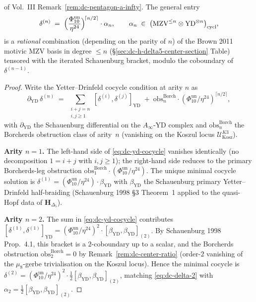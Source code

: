 \begin{proposition}
of Vol.~III
Remark~\ref{rem:dc-pentagon-a-infty}. The general entry
\begin{equation}
\label{eq:dc-delta-n-ansatz}
 \delta^{(n)} \;=\;
 \Bigl(\frac{\Phi_{10}^{\mathrm{un}}}{\eta^{24}}\Bigr)^{\!\lceil n/2\rceil}
 \cdot\alpha_n,
 \qquad
 \alpha_n \;\in\;
 \bigl(\mathrm{MZV}^{\leq n}\otimes\mathrm{YD}^{\otimes n}\bigr)_{\mathrm{cycl}},
\end{equation}
is a \emph{rational} combination (depending on the parity of $n$)
of the Brown 2011 motivic MZV basis in degree $\leq n$
(\S\ref{sec:dc-h-delta5-center-section} Table) tensored with the iterated
Schauenburg bracket, modulo the coboundary of
$\delta^{(n-1)}$.
\end{proposition}

\begin{proof}
Write the Yetter--Drinfeld cocycle condition at arity $n$ as
\begin{equation}
\label{eq:dc-yd-cocycle}
 \partial_{\mathrm{YD}}\,\delta^{(n)}
 \;=\;
 \sum_{\substack{i+j=n\\ i,j\geq 1}} [\delta^{(i)}, \delta^{(j)}]_{\mathrm{YD}}
 \;+\;
 \mathrm{obs}^{\mathrm{Borch}}_n\cdot (\Phi_{10}^{\mathrm{un}}/\eta^{24})^{\lceil n/2\rceil},
\end{equation}
with $\partial_{\mathrm{YD}}$ the Schauenburg differential on the
$A_\infty$-YD complex and
$\mathrm{obs}^{\mathrm{Borch}}_n$ the Borcherds obstruction class
of arity~$n$ (vanishing on the Koszul locus
$\mathcal{U}_{\mathrm{Kosz}}^{K3}$).

\textbf{Arity $n = 1$.} The left-hand side of \eqref{eq:dc-yd-cocycle}
vanishes identically (no decomposition $1 = i + j$ with $i,j\geq 1$);
the right-hand side reduces to the primary Borcherds-leg obstruction
$\mathrm{obs}^{\mathrm{Borch}}_1\cdot(\Phi_{10}^{\mathrm{un}}/\eta^{24})$. The
unique minimal cocycle solution is
$\delta^{(1)} = (\Phi_{10}^{\mathrm{un}}/\eta^{24})\cdot\beta_{\mathrm{YD}}$ with
$\beta_{\mathrm{YD}}$ the Schauenburg primary Yetter--Drinfeld
half-braiding (Schauenburg 1998 \S3 Theorem~1 applied to the
quasi-Hopf data of $\mathbf{H}_{\Delta_5}$).

\textbf{Arity $n = 2$.} The sum in \eqref{eq:dc-yd-cocycle}
contributes
$[\delta^{(1)},\delta^{(1)}]_{\mathrm{YD}}
 = (\Phi_{10}^{\mathrm{un}}/\eta^{24})^2\cdot[\beta_{\mathrm{YD}},\beta_{\mathrm{YD}}]_{(2)}$.
By Schauenburg 1998 Prop.~4.1, this bracket is a $2$-coboundary
up to a scalar, and the Borcherds obstruction
$\mathrm{obs}^{\mathrm{Borch}}_2 = 0$ by
Remark~\ref{rem:dc-center-ratio} (order-$2$ vanishing of
the $\mu_8$-gerbe trivialisation on the Koszul locus). Hence the
minimal cocycle is
$\delta^{(2)} = (\Phi_{10}^{\mathrm{un}}/\eta^{24})^2\cdot\tfrac{1}{2}[\beta_{\mathrm{YD}},\beta_{\mathrm{YD}}]_{(2)}$,
matching \eqref{eq:dc-delta-2} with $\alpha_2 = \tfrac{1}{2}[\beta_{\mathrm{YD}},\beta_{\mathrm{YD}}]_{(2)}$.


\end{proof}
